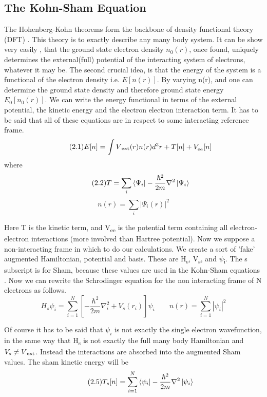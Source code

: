 \documentclass[12pt]{article}
\begin{document}
\subsection{The Kohn-Sham Equation}
The Hohenberg-Kohn theorems form the backbone of density functional theory (DFT) \cite{inhom}. This theory is to exactly describe any many body system. It can be show very easily \cite{martin}, that the ground state electron density $n_0(r)$, once found, uniquely determines the external(full) potential of the interacting system of electrons, whatever it may be. The second crucial idea, is that the energy of the system is a functional of the electron density i.e. $E[n(r)]$. By varying n(r), and one can determine the ground state density and therefore ground state energy $E_0[n_0(r)]$.
We can write the energy functional in terms of the external potential, the kinetic energy and the electron electron interaction term. It has to be said that all of these equations are in respect to some interacting reference frame.
\begin{equation} \label{2.1} \tag{2.1}
E[n]=\int V\textsubscript{ext}(r)n(r)d^3r + T[n] + V_\textsubscript{ee}[n]
\end{equation}
where 
\begin{equation} \label{2.2} \tag{2.2}
T=\sum_{i} \bra{\Psi_i}-\frac{\hbar^2}{2m}\nabla ^2 \ket{\Psi_i} 
\end{equation}
\begin{equation} \label{2.3} \tag{2.3}
n(r)=\sum_{i} | \Psi_i(r) |^2 
\end{equation}

Here T is the kinetic term, and V\textsubscript{ee} is the potential term containing all electron-electron interactions (more involved than Hartree potential). Now we suppose a non-interacting frame in which to do our calculations. We create a sort of 'fake' augmented Hamiltonian, potential and basis. These are H\textsubscript{s}, V\textsubscript{s}, and $\psi$\textsubscript{i}. The s subscript is for Sham, because these values are used in the Kohn-Sham equations \cite{inhom}. Now we can rewrite the Schrodinger equation for the non interacting frame of N electrons as follows.
\begin{equation} \label{2.4} \tag{2.4}
H_s\psi_i = \sum_{i=1}^{N} [-\frac{\hbar^2}{2m}\nabla_i ^2 + V_s(r_i)] \psi_i \qquad n(r)=\sum_{i=1}^{N} |\psi_i|^2 
\end{equation}

Of course it has to be said that $\psi_i$ is not exactly the single electron wavefunction, in the same way that H\textsubscript{s} is not exactly the full many body Hamiltonian and $V_s \neq V\textsubscript{ext}$. Instead the interactions are absorbed into the augmented Sham values. The sham kinetic energy will be
\begin{equation} \label{2.5} \tag{2.5}
T_s[n]=\sum_{i=1}^{N} \bra{\psi_i}-\frac{\hbar^2}{2m}\nabla^2\ket{\psi_i}
\end{equation}
\end{document}
